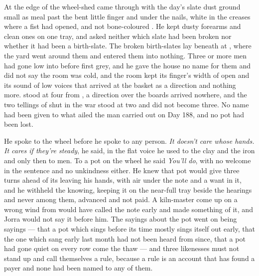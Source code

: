 At the edge of the wheel-shed  came through with the day's slate dust ground small as meal past the bent little finger and under the nails, white in the creases where a fist had opened, and not bone-coloured . He kept dusty forearms and clean ones on one tray, and asked neither which slate had been broken nor whether it had been a birth-slate. The broken birth-slates lay beneath  at , where the yard went around them and entered them into nothing. Three or more men had gone low into  before first grey, and he gave the house no name for them and did not say the room was cold, and the room kept its finger's width of open and its sound of low voices that arrived at the basket as a direction and nothing more.  stood at four from , a direction over the boards arrived nowhere, and the two tellings of  shut in the war stood at two and did not become three. No name had been given to what ailed the man carried out on Day 188, and no pot had been lost.

He spoke to the wheel before he spoke to any person. \emph{It doesn't care whose hands. It cares if they're steady}, he said, in the flat voice he used to the clay and the iron and only then to men. To a pot on the wheel he said \emph{You'll do}, with no welcome in the sentence and no unkindness either. He knew  that pot would give three turns ahead of its leaving his hands, with air under the note and a want in it, and he withheld the knowing, keeping it on the near-full tray beside the hearings and never among them, advanced and not paid. A kiln-master come up on a wrong wind from  would have called the note early and made something of it, and Jorra would not say it before him. The sayings about the pot went on being sayings --- that a pot which sings before its time mostly sings itself out early, that the one which sang early last month had not been heard from since, that a pot had gone quiet on every row come the thaw --- and three likenesses must not stand up and call themselves a rule, because a rule is an account that has found a payer and none had been named to any of them.

